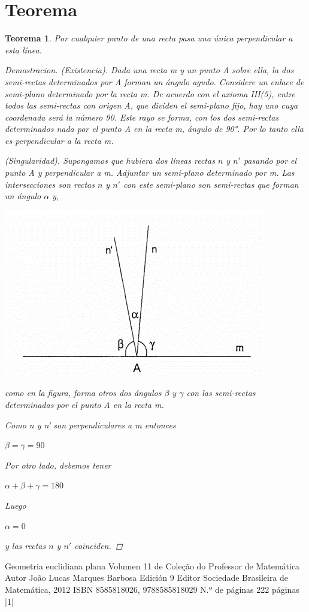 \documentclass[12pt a4paper]{article}
\newtheorem{teor}{Teorema}
\begin{document}
\section{Teorema}
\begin{teor}\label{uno}
Por cualquier punto de una recta pasa una única perpendicular a esta línea.
\begin{proof}[Demostracion]
(Existencia). Dada una recta m y un punto A sobre ella, la
dos semi-rectas determinados por A forman un ángulo agudo. Considere un enlace de semi-plano determinado por la recta m. De acuerdo con el axioma III(5), entre todos las semi-rectas con origen A, que dividen el semi-plano fijo, hay uno cuya coordenada será la
número 90. Este rayo se forma, con los dos semi-rectas determinados
nada por el punto A en la recta m, ángulo de 90°. Por lo tanto ella es
perpendicular a la recta m.

(Singularidad). Supongamos que hubiera dos líneas rectas ${n}$ y ${n}'$ pasando por el punto A y perpendicular a m. Adjuntar un semi-plano determinado por m. Las intersecciones son rectas ${n}$ y ${n}'$ con este semi-plano son semi-rectas que forman un ángulo 
$\alpha$ y,
\begin{center}
    \includegraphics[scale=0.8]{Imagen1.png}
\end{center}
como en la figura, forma otros dos ángulos $\beta$ y $\gamma$ con las semi-rectas
determinadas por el punto A en la recta m.

Como n y {n}' son perpendiculares a m entonces 
\begin{center}
    $\beta=\gamma=90$
\end{center}
Por otro lado, debemos tener 
\begin{center}
    $\alpha+\beta+\gamma=180$
\end{center}
Luego
\begin{center}
    $\alpha=0$
\end{center}
 y las rectas ${n}$ y ${n}'$ coinciden.

\end{proof}
\end{teor}



Geometria euclidiana plana
Volumen 11 de Coleção do Professor de Matemática
Autor	João Lucas Marques Barbosa
Edición	9
Editor	Sociedade Brasileira de Matemática, 2012
ISBN	8585818026, 9788585818029
N.º de páginas	222 páginas |1|
\end{document}
